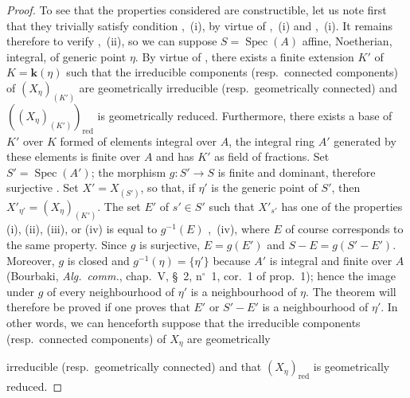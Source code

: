 \begin{proof}
To see that the properties considered are constructible, let us note first that they trivially satisfy condition ,~(i), by virtue of ,~(i) and ,~(i).
It remains therefore to verify ,~(ii), so we can suppose $S=\operatorname{Spec}(A)$ affine, Noetherian, integral, of generic point $\eta$.
By virtue of , there exists a finite extension $K'$ of $K=\boldsymbol{k}(\eta)$ such that the irreducible components (resp.\ connected components) of $(X_\eta)_{(K')}$ are geometrically irreducible (resp.\ geometrically connected) and $((X_\eta)_{(K')})_\mathrm{red}$ is geometrically reduced.
Furthermore, there exists a base of $K'$ over $K$ formed of elements integral over $A$, the integral ring $A'$ generated by these elements is finite over $A$ and has $K'$ as field of fractions.
Set $S'=\operatorname{Spec}(A')$; the morphism $g:S'\to S$ is finite and dominant, therefore surjective . Set $X'=X_{(S')}$, so that, if $\eta'$ is the generic point of $S'$, then $X'_{\eta'}=(X_\eta)_{(K')}$. The set $E'$ of $s'\in S'$ such that $X'_{s'}$ has one of the properties (i), (ii), (iii), or (iv) is equal to $g^{-1}(E)$ ,~(iv), where $E$ of course corresponds to the same property. Since $g$ is surjective, $E=g(E')$ and $S-E=g(S'-E')$. Moreover, $g$ is closed and $g^{-1}(\eta)=\{\eta'\}$ because $A'$ is integral and finite over $A$ (Bourbaki, \emph{Alg.\ comm.}, chap.\ V, \S~2, n$^\circ$~1, cor.\ 1 of prop.\ 1); hence the image under $g$ of every neighbourhood of $\eta'$ is a neighbourhood of $\eta$.
The theorem will therefore be proved if one proves that $E'$ or $S'-E'$ is a neighbourhood of $\eta'$.
In other words, we can henceforth suppose that the irreducible components (resp.\ connected components) of $X_\eta$ are geometrically


irreducible (resp.\ geometrically connected) and that $(X_\eta)_\mathrm{red}$ is geometrically reduced.


\end{proof}
